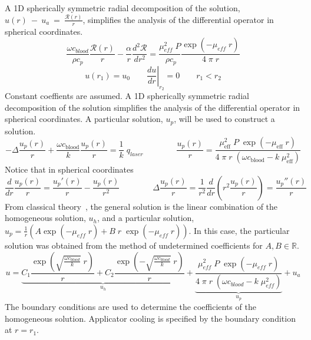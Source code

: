 \documentclass{article}         %
\theoremstyle{definition}
\theoremstyle{remark}
\begin{document}
A 1D spherically symmetric radial decomposition 
of the solution,
$u(r)~-~u_a~=~\frac{\mathcal{R}(r)}{r}$, simplifies the analysis of the differential operator in
spherical coordinates.
\[
    \frac{\omega c_\textit{blood}}{\rho c_p}  \frac{ \mathcal{R}(r)}{r} 
   -
    \frac{\alpha }{r}   \frac{d^2 \mathcal{R}}{dr^2}
   = 
    \frac{\mu_\textit{eff}^2 \;  P}{ \; \rho c_p}   
    \frac{ \exp \left(-\mu_\textit{eff} \; r \right) }{ 4 \; \pi \; r}
\]
\[
   u(r_1) = u_0
  \qquad
  \left. \frac{d u}{dr} \right|_{r_2}  = 0
  \qquad
   r_1 < r_2
\]
Constant coeffients are assumed. A 1D spherically symmetric radial decomposition 
of the solution
simplifies the analysis of the differential operator in spherical coordinates.
A particular solution, $u_p$, will be used to construct a solution. 
\[
 -\Delta  \frac{u_p(r)}{r} 
 + \frac{\omega c_\text{blood}}{k}  \frac{u_p(r)}{r} 
 = \frac{1}{k} \; q_{laser}
\qquad
\qquad
  \frac{u_p(r)}{r}  = 
    \frac{\mu_\text{eff}^2 \; P \; \exp \left(-\mu_\text{eff} \; r \right) }
         { 4 \; \pi \; r \; \left(\omega c_\text{blood}-k \; \mu_\text{eff}^2 \right)} 
\]
Notice that in spherical coordinates
\[
  \frac{d}{dr}  \frac{u_p(r)}{r} 
   = 
    \frac{u_p'(r)}{r}  - \frac{u_p(r)}{r^2}   
  \qquad
  \qquad
 \Delta  \frac{u_p(r)}{r} 
   = 
  \frac{1}{r^2} 
  \frac{d}{dr} \left( r^2 \frac{u_p(r)}{r}  \right)
   = 
    \frac{u_p''(r)}{r} 
\]
From classical theory~\cite{boyce1992elementary}, 
the general solution is the linear combination of the homogeneous solution, $u_h$, and
a particular solution, 
$ u_p = \frac{1}{r} \left( A \exp (-\mu_\textit{eff} \; r) + B \; r \;  \exp
(-\mu_\textit{eff} \; r) \right) $.
In this case, the particular solution was obtained from the method of undetermined
coefficients for $A,B \in \mathbb{R}$. 
\begin{equation}\label{OneDSolution}
u = 
  \underbrace{
    C_1 \frac{\exp\left( \sqrt{\frac{\omega c_\textit{blood}}{k}} \; r \right)}{r}  
  + 
    C_2 \frac{\exp\left(-\sqrt{\frac{\omega c_\textit{blood}}{k}} \; r \right)}{r}  
    }_{u_h}
  + 
  \underbrace{
    \frac{\mu_\textit{eff}^2 \; P \; \exp \left(-\mu_\textit{eff} \; r \right) }
         { 4 \; \pi \; r \; \left(\omega c_\textit{blood}-k \; \mu_\textit{eff}^2 \right)} 
    }_{u_p}
  + 
    u_a
\end{equation}
The boundary conditions are used to determine the coefficients of the homogeneous solution.
Applicator cooling is specified by the boundary condition at $r = r_1$.
\end{document}
